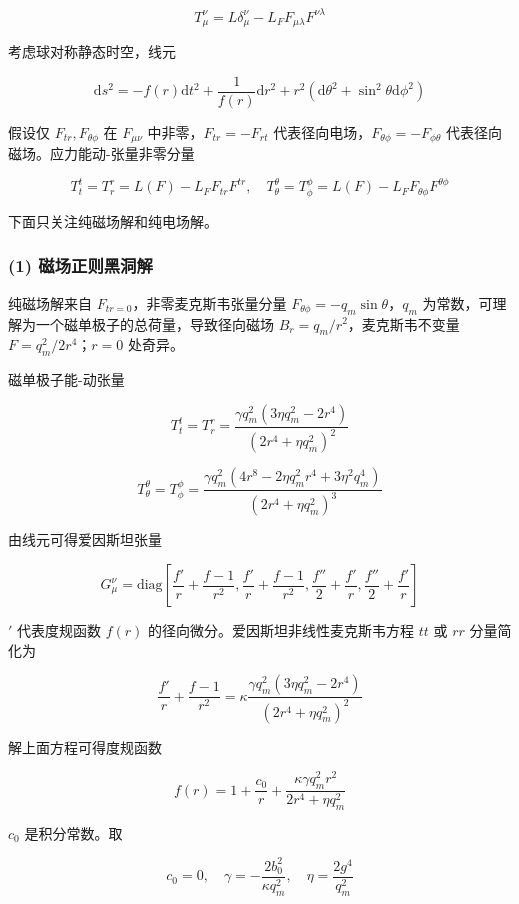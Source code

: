 \documentclass[aps,prl,preprint,groupedaddress]{revtex4-2}
\begin{document}
$$
T_\mu^\nu
=L\delta_\mu^\nu - L_F F_{\mu\lambda} F^{\nu \lambda}
$$

考虑球对称静态时空，线元

$$
\mathrm{d}s^2
=-f(r)\mathrm{d}t^2 + \frac{1 }{f(r) } \mathrm{d}r^2 + r^2\left(\mathrm{d}\theta^2+\sin^2\theta\mathrm{d}\phi^2 \right)
$$

假设仅 $F_{tr},F_{\theta\phi} $ 在 $F_{\mu\nu} $ 中非零，$F_{tr}=-F_{rt} $ 代表径向电场，$F_{\theta\phi}=-F_{\phi\theta} $ 代表径向磁场。应力能动-张量非零分量

$$
T_t^t = T_r^r
=L(F) - L_F F_{tr}F^{tr},\quad 
T_\theta^\theta
=T_\phi^\phi
=L(F) - L_F F_{\theta\phi}F^{\theta\phi}
$$

下面只关注纯磁场解和纯电场解。

\subsubsection{(1) 磁场正则黑洞解}

纯磁场解来自 $F_{tr=0} $，非零麦克斯韦张量分量 $F_{\theta\phi}=-q_m \sin\theta $，$q_m $ 为常数，可理解为一个磁单极子的总荷量，导致径向磁场 $B_r=q_m/r^2 $，麦克斯韦不变量 $F=q_m^2/2r^4 $；$r=0 $ 处奇异。

磁单极子能-动张量

$$
T_t^t
=T_r^r
=\frac{\gamma q_m^2\left(3\eta q_m^2-2r^4 \right) }{\left(2r^4+\eta q_m^2 \right)^2 }
$$

$$
T_\theta^\theta
=T_\phi^\phi
=\frac{\gamma q_m^2\left(4 r^8-2\eta q_m^2 r^4+3\eta^2q_m^4 \right) }{\left(2r^4+\eta q_m^2 \right)^3 }
$$

由线元可得爱因斯坦张量

$$
G_\mu^\nu
=\mathrm{diag}\left[\frac{f' }{r } + \frac{f-1 }{r^2 } ,\frac{f' }{r } + \frac{f-1 }{r^2 } , \frac{f'' }{2 } + \frac{f' }{r } , \frac{f'' }{2 } + \frac{f' }{r }  \right]
$$

$' $ 代表度规函数 $f(r) $ 的径向微分。爱因斯坦非线性麦克斯韦方程 $tt $ 或 $rr $ 分量简化为

$$
\frac{f' }{r } + \frac{f-1 }{r^2 } 
=\kappa \frac{\gamma q_m^2\left(3\eta q_m^2-2r^4 \right) }{\left(2r^4+\eta q_m^2 \right)^2 }
$$

解上面方程可得度规函数

$$
f(r)
=1+\frac{c_0 }{r } + \frac{\kappa \gamma q_m^2 r^2 }{2r^4+\eta q_m^2 } 
$$

$c_0 $ 是积分常数。取

$$
c_0=0,\quad
\gamma=-\frac{2b_0^2 }{\kappa q_m^2} ,\quad
\eta=\frac{2g^4 }{q_m^2 }
$$
\end{document}
